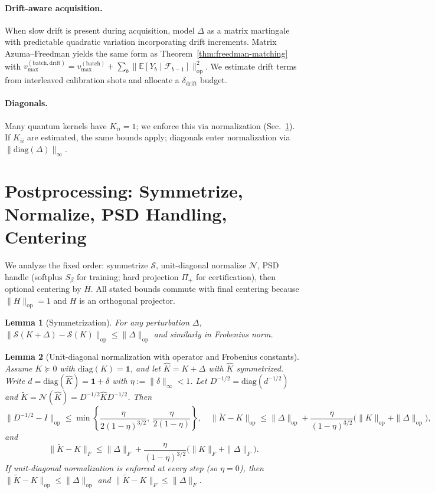 \documentclass{article}
\newtheorem{lemma}{Lemma}
\begin{document}
\paragraph{Drift-aware acquisition.}
When slow drift is present during acquisition, model $\Delta$ as a matrix martingale with predictable quadratic variation incorporating drift increments. Matrix Azuma–Freedman yields the same form as Theorem~\ref{thm:freedman-matching} with $v_{\max}^{(\mathrm{batch,drift})}=v_{\max}^{(\mathrm{batch})}+ \sum_b \| \mathbb{E}[Y_b\mid \mathcal{F}_{b-1}]\|_{\mathrm{op}}^2$. We estimate drift terms from interleaved calibration shots and allocate a $\delta_{\mathrm{drift}}$ budget.

\paragraph{Diagonals.} Many quantum kernels have $K_{ii}=1$; we enforce this via normalization (Sec.~\ref{sec:postproc}). If $K_{ii}$ are estimated, the same bounds apply; diagonals enter normalization via $\|\mathrm{diag}(\Delta)\|_\infty$.

\section{Postprocessing: Symmetrize, Normalize, PSD Handling, Centering}\label{sec:postproc}
We analyze the fixed order: symmetrize $\mathcal{S}$, unit-diagonal normalize $\mathcal{N}$, PSD handle (softplus $S_\beta$ for training; hard projection $\Pi_+$ for certification), then optional centering by $H$. All stated bounds commute with final centering because $\|H\|_{\mathrm{op}}=1$ and $H$ is an orthogonal projector.

\begin{lemma}[Symmetrization]\label{lem:symm}
For any perturbation $\Delta$, $\|\mathcal{S}(K+\Delta)-\mathcal{S}(K)\|_{\mathrm{op}}\le \|\Delta\|_{\mathrm{op}}$ and similarly in Frobenius norm.
\end{lemma}

\begin{lemma}[Unit-diagonal normalization with operator and Frobenius constants]\label{lem:normalize}
Assume $K\succeq 0$ with $\mathrm{diag}(K)=\mathbf{1}$, and let $\widehat{K}=K+\Delta$ with $\widehat{K}$ symmetrized. Write $d=\mathrm{diag}(\widehat{K})=\mathbf{1}+\delta$ with $\eta:=\|\delta\|_\infty<1$. Let $D^{-1/2}=\mathrm{diag}(d^{-1/2})$ and $\widetilde{K}=\mathcal{N}(\widehat{K})=D^{-1/2}\widehat{K}D^{-1/2}$. Then
\[
\|D^{-1/2}-I\|_{\mathrm{op}}\le \min\left\{\frac{\eta}{2(1-\eta)^{3/2}},\ \frac{\eta}{2(1-\eta)}\right\},\quad
\|\widetilde{K}-K\|_{\mathrm{op}} \le \|\Delta\|_{\mathrm{op}} + \frac{\eta}{(1-\eta)^{3/2}}\big(\|K\|_{\mathrm{op}}+\|\Delta\|_{\mathrm{op}}\big),
\]
and
\[
\|\widetilde{K}-K\|_{F} \le \|\Delta\|_{F} + \frac{\eta}{(1-\eta)^{3/2}}\big(\|K\|_{F}+\|\Delta\|_{F}\big).
\]
If unit-diagonal normalization is enforced at every step (so $\eta=0$), then $\|\widetilde{K}-K\|_{\mathrm{op}}\le \|\Delta\|_{\mathrm{op}}$ and $\|\widetilde{K}-K\|_{F}\le \|\Delta\|_{F}$.
\end{lemma}
\end{document}
